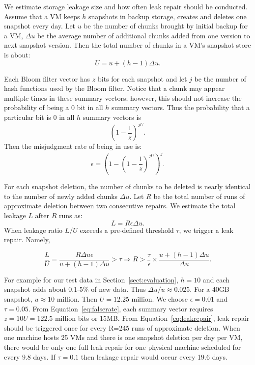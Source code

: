 \begin{itemize}
\end{itemize}

We estimate storage leakage size and how often leak repair should be conducted.
Assume that  a VM keeps $h$ snapshots in backup storage, creates and deletes one snapshot
every day. Let $u$ be the number of chunks brought by initial backup for a VM, $\Delta u$ be the average
number of additional chunks added from one version to next snapshot version. Then the total number of 
chunks in a VM's snapshot store is about:
\[
U = u + (h-1)\Delta u.
\]

Each Bloom filter vector has  $z$ bits for each snapshot and let $j$ be the number of hash functions used by the
Bloom filter.  Notice that a chunk may appear multiple times in these summary vectors; however, this should not 
increase the probability of being a 0 bit in all $h$ summary vectors.
Thus the probability that a particular bit is 0  in all $h$ summary vectors is  
\[
(1- \frac{1}{z}) ^{j U}.
\] 
Then the misjudgment rate of being in use  is: 
\begin{equation}
\label{eq:falserate}
\epsilon = (1-(1-\frac{1}{z})^{jU})^j.
\end{equation}

For each snapshot deletion, the number of chunks to be deleted is nearly identical to the number of
newly added chunks $\Delta u$. 
Let $R$ be the total number of runs of approximate deletion between two consecutive 
repairs. We estimate  the total leakage $L$ after $R$ runs as:
\[
L = R \epsilon \Delta u.
\]
When leakage ratio $L/U$ exceeds a pre-defined threshold $\tau$, we trigger a leak repair. Namely,

\begin{equation}
\label{eq:leakrepair}
\frac{L}{U} = \frac{R \Delta u \epsilon}{u+(h-1)\Delta u } > \tau 
\Longrightarrow R > \frac{\tau}{\epsilon}\times\frac{u + (h-1)\Delta u}{\Delta u}.
\end{equation}

For example for our test data in Section~\ref{sect:evaluation},  
$h=10$ and each snapshot adds
about 0.1-5\% of new data. Thus ${\Delta u}/{u} \approx 0.025$. For a 40GB snapshot, $u\approx  10$ million.
Then $U=12.25$ million.
We choose  $\epsilon = 0.01$ and $\tau=0.05$.  From Equation~\ref{eq:falserate}, 
each summary vector requires $z=10U=122.5$ million bits or 15MB. From Equation~\ref{eq:leakrepair}, 
leak repair should be triggered once for every R=245 runs of approximate deletion. 
When one machine hosts 25 VMs and there is one snapshot deletion per day per VM, there would be 
only one full leak repair for one physical machine scheduled for every 9.8 days. 
If $\tau = 0.1$ then leakage repair would occur every 19.6 days.

